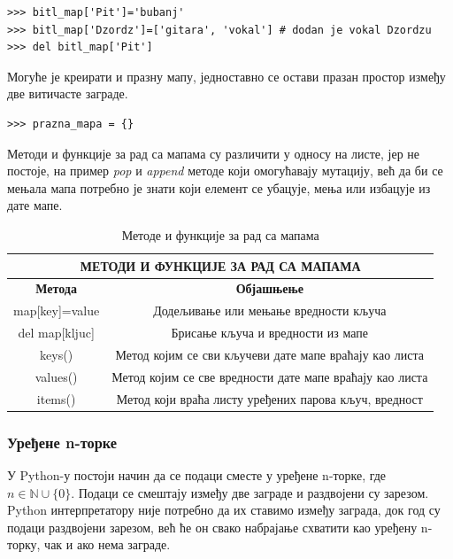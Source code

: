 \begin{lstlisting}[caption = Мутација мапа, label = mutacija_mapa]
>>> bitl_map['Pit']='bubanj'
>>> bitl_map['Dzordz']=['gitara', 'vokal'] # dodan je vokal Dzordzu
>>> del bitl_map['Pit']
\end{lstlisting}

Могуће је креирати и празну мапу, једноставно се остави празан простор између две витичасте заграде.

\begin{lstlisting}[caption = Креирање празне мапе, label=prazna_mapa]
>>> prazna_mapa = {}
\end{lstlisting}

Методи и функције за рад са мапама су различити у односу на листе, јер не постоје, на пример \emph{pop} и \emph{append} методе који омогућавају мутацију, већ да би се мењала мапа потребно је знати који елемент се убацује, мења или избацује из дате мапе.

\begin{table}[here]
\centering
\begin{tabular}{|c|c|} \hline
\multicolumn{2}{|c|}{\textbf{МЕТОДИ И ФУНКЦИЈЕ ЗА РАД СА МАПАМА}} \\ \hline
\textbf{Метода} & \textbf{Објашњење} \\ \hline
map[key]=value & Додељивање или мењање вредности кључа \\ \hline
del map[kljuc] & Брисање кључа и вредности из мапе  \\ \hline
keys() & Метод којим се сви кључеви дате мапе враћају као листа  \\ \hline
values() & Метод којим се све вредности дате мапе враћају као листа  \\ \hline
items() & Метод који враћа листу уређених парова кључ, вредност  \\ \hline
\end{tabular}
\caption{Методе и функције за рад са мапама}
\label{tabela:mape}
\end{table}

\subsubsection{Уређене n-торке}

У Python-у постоји начин да се подаци сместе у уређене n-торке, где $n \in \mathbb{N}\cup\{0\}$. Подаци се смештају између две заграде и раздвојени су зарезом. Python интерпретатору није потребно да их ставимо између заграда, док год су подаци раздвојени зарезом, већ ће он свако набрајање схватити као уређену n-торку, чак и ако нема заграде.

